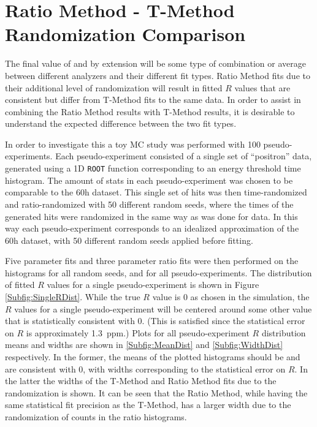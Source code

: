 
\thispagestyle{myheadings}

\graphicspath{{Body/Figures/Wa/T-Method-Comparison/}}

\chapter{Ratio Method - T-Method Randomization Comparison}
\label{app:RTComparison}


The final value of \wa and by extension \amu will be some type of combination or average between different analyzers and their different fit types. Ratio Method fits due to their additional level of randomization will result in fitted $R$ values that are consistent but differ from T-Method fits to the same data. In order to assist in combining the Ratio Method results with T-Method results, it is desirable to understand the expected difference between the two fit types.


In order to investigate this a toy MC study was performed with 100 pseudo-experiments. Each pseudo-experiment consisted of a single set of ``positron'' data, generated using a 1D \texttt{ROOT} function corresponding to an energy threshold time histogram. The amount of stats in each pseudo-experiment was chosen to be comparable to the 60h dataset. This single set of hits was then time-randomized and ratio-randomized with 50 different random seeds, where the times of the generated hits were randomized in the same way as was done for data. In this way each pseudo-experiment corresponds to an idealized approximation of the 60h dataset, with 50 different random seeds applied before fitting.

Five parameter fits and three parameter ratio fits were then performed on the histograms for all random seeds, and for all pseudo-experiments. The distribution of fitted $R$ values for a single pseudo-experiment is shown in Figure \ref{Subfig:SingleRDist}. While the true $R$ value is 0 as chosen in the simulation, the $R$ values for a single pseudo-experiment will be centered around some other value that is statistically consistent with 0. (This is satisfied since the statistical error on $R$ is approximately \SI{1.3}{ppm}.) Plots for all pseudo-experiment $R$ distribution means and widths are shown in \ref{Subfig:MeanDist} and \ref{Subfig:WidthDist} respectively. In the former, the means of the plotted histograms should be and are consistent with 0, with widths corresponding to the statistical error on $R$. In the latter the widths of the T-Method and Ratio Method fits due to the randomization is shown. It can be seen that the Ratio Method, while having the same statistical fit precision as the T-Method, has a larger width due to the randomization of counts in the ratio histograms. 


